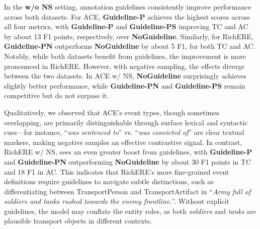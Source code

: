 In the \textbf{w/o NS} setting, annotation guidelines consistently improve performance across both datasets. For {ACE}, \textbf{Guideline-P} achieves the highest scores across all four metrics, with \textbf{Guideline-P} and \textbf{Guideline-PS} improving TC and AC by about 13 F1 points, respectively, over \textbf{NoGuideline}. Similarly, for {RichERE}, \textbf{Guideline-PN} outperforms \textbf{NoGuideline} by about 5 F1, for both TC and AC. Notably, while both datasets benefit from guidelines, the improvement is more pronounced in RichERE. 
However, with negative sampling, the effects diverge between the two datasets. In {ACE w/ NS}, \textbf{NoGuideline} surprisingly achieves slightly better performance, while \textbf{Guideline-PN} and \textbf{Guideline-PS} remain competitive but do not surpass it. 

Qualitatively, we observed that ACE’s event types, though sometimes overlapping, are primarily distinguishable through surface lexical and syntactic cues—for instance, ``\textit{was sentenced to}'' vs. ``\textit{was convicted of}'' are clear textual markers, making negative samples an effective contrastive signal. In contrast, {RichERE w/ NS}, sees an even greater boost from guidelines, with \textbf{Guideline-P} and \textbf{Guideline-PN} outperforming \textbf{NoGuideline} by about 30 F1 points in TC and 18 F1 in AC. This indicates that RichERE's more fine-grained event definitions require guidelines to navigate subtle distinctions, such as differentiating between TransportPerson and TransportArtifact in ``\textit{Army full of soldiers and tanks rushed towards the enemy frontline.}''. Without explicit guidelines, the model may conflate the entity roles, as both \textit{soldiers} and \textit{tanks} are plausible transport objects in different contexts. 

